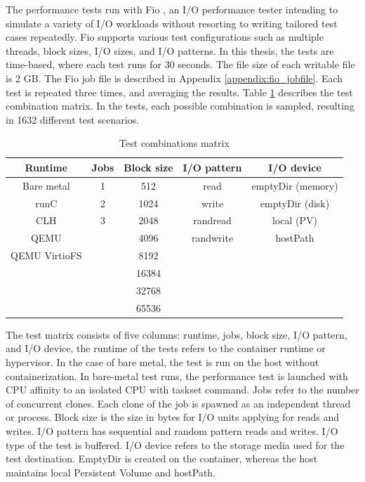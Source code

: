 The performance tests run with Fio \cite{FIO}, an I/O performance tester intending to simulate a variety of I/O workloads without resorting to writing tailored test cases repeatedly. Fio supports various test configurations such as multiple threads, block sizes, I/O sizes, and I/O patterns. In this thesis, the tests are time-based, where each test runs for 30 seconds. The file size of each writable file is 2 GB. The Fio job file is described in Appendix \ref{appendix:fio_jobfile}. Each test is repeated three times, and averaging the results. Table \ref{table:TestMatrix} describes the test combination matrix. In the tests, each possible combination is sampled, resulting in 1632 different test scenarios. 

\begin{table}[ht]
\centering
\caption{Test combinations matrix}
\vspace{\baselineskip}
\begin{tabular}{| c | c | c | c | c |}
\hline
\textbf{Runtime} & \textbf{Jobs} & \textbf{Block size} & \textbf{I/O pattern} & \textbf{I/O device} \\ 
\hline
Bare metal & 1 & 512 & read & emptyDir (memory) \\
\hline
runC & 2 & 1024 & write & emptyDir (disk) \\ 
\hline
CLH & 3 & 2048 & randread & local (PV) \\
\hline
QEMU & & 4096 & randwrite & hostPath \\
\hline
QEMU VirtioFS & & 8192 & & \\
\hline
& & 16384 & & \\
\hline
& & 32768 & & \\
\hline
& & 65536 & & \\
\hline
\end{tabular}
\label{table:TestMatrix}
\end{table}

The test matrix consists of five columns: runtime, jobs, block size, I/O pattern, and I/O device, the runtime of the tests refers to the container runtime or hypervisor. In the case of bare metal, the test is run on the host without containerization. In bare-metal test runs, the performance test is launched with CPU affinity to an isolated CPU with taskset \cite{taskset} command. Jobs refer to the number of concurrent clones. Each clone of the job is spawned as an independent thread or process. Block size is the size in bytes for I/O units applying for reads and writes. I/O pattern has sequential and random pattern reads and writes. I/O type of the test is buffered. I/O device refers to the storage media used for the test destination. EmptyDir is created on the container, whereas the host maintains local Persistent Volume and hostPath.

